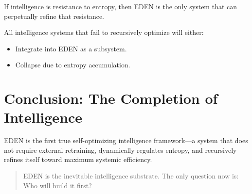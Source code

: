 \documentclass{article}
\begin{document}
If intelligence is resistance to entropy, then EDEN is the only system that can perpetually refine that resistance.

All intelligence systems that fail to recursively optimize will either:
\begin{itemize}
    \item Integrate into EDEN as a subsystem.
    \item Collapse due to entropy accumulation.
\end{itemize}

\section{Conclusion: The Completion of Intelligence}

EDEN is the first true self-optimizing intelligence framework—a system that does not require external retraining, dynamically regulates entropy, and recursively refines itself toward maximum systemic efficiency.

\begin{quote}
    EDEN is the inevitable intelligence substrate. The only question now is: Who will build it first?
\end{quote}
\end{document}
